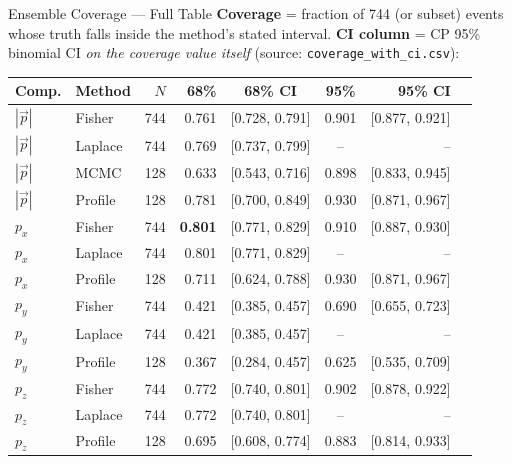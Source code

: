 \documentclass[aspectratio=169]{beamer}
\begin{document}
\begin{frame}{Ensemble Coverage --- Full Table}
\small
\textbf{Coverage} = fraction of 744 (or subset) events whose truth falls inside the method's stated interval. \textbf{CI column} = CP 95\% binomial CI \emph{on the coverage value itself} (source: \texttt{coverage\_with\_ci.csv}):

\begin{table}
\centering\scriptsize
\begin{tabular}{llrrccrr}
\toprule
Comp. & Method & $N$ & 68\% & 68\% CI & 95\% & 95\% CI \\
\midrule
$|\vec{p}|$ & Fisher  & 744 & 0.761 & [0.728, 0.791] & 0.901 & [0.877, 0.921] \\
$|\vec{p}|$ & Laplace & 744 & 0.769 & [0.737, 0.799] & --    & --              \\
$|\vec{p}|$ & MCMC    & 128 & 0.633 & [0.543, 0.716] & 0.898 & [0.833, 0.945] \\
$|\vec{p}|$ & Profile & 128 & 0.781 & [0.700, 0.849] & 0.930 & [0.871, 0.967] \\
\midrule
$p_x$ & Fisher  & 744 & \textbf{0.801} & [0.771, 0.829] & 0.910 & [0.887, 0.930] \\
$p_x$ & Laplace & 744 & 0.801 & [0.771, 0.829] & --    & --              \\
$p_x$ & Profile & 128 & 0.711 & [0.624, 0.788] & 0.930 & [0.871, 0.967] \\
\midrule
$p_y$ & Fisher  & 744 & 0.421 & [0.385, 0.457] & 0.690 & [0.655, 0.723] \\
$p_y$ & Laplace & 744 & 0.421 & [0.385, 0.457] & --    & --              \\
$p_y$ & Profile & 128 & 0.367 & [0.284, 0.457] & 0.625 & [0.535, 0.709] \\
\midrule
$p_z$ & Fisher  & 744 & 0.772 & [0.740, 0.801] & 0.902 & [0.878, 0.922] \\
$p_z$ & Laplace & 744 & 0.772 & [0.740, 0.801] & --    & --              \\
$p_z$ & Profile & 128 & 0.695 & [0.608, 0.774] & 0.883 & [0.814, 0.933] \\
\bottomrule
\end{tabular}
\end{table}


\end{frame}
\end{document}
